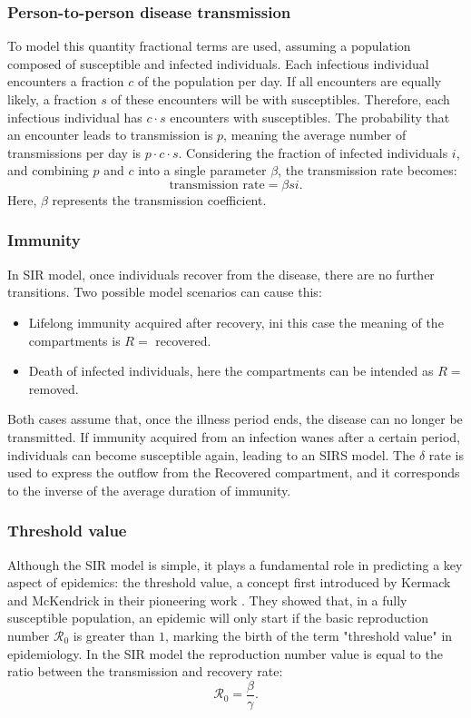 \subsubsection{Person-to-person disease transmission}
\label{subsubsec:p2p_transmission}
To model this quantity fractional terms are used, assuming a population composed of susceptible and infected individuals. Each infectious individual encounters a fraction $c$ of the population per day. If all encounters are equally likely, a fraction $s$ of these encounters will be with susceptibles. Therefore, each infectious individual has $c\cdot s$ encounters with susceptibles. The probability that an encounter leads to transmission is $p$, meaning the average number of transmissions per day is $p \cdot c \cdot s$. Considering the fraction of infected individuals $i$, and combining $p$ and $c$ into a single parameter $\beta$, the transmission rate becomes:
\[\text{transmission rate} = \beta s i.\]
Here, $\beta$ represents the transmission coefficient.


\subsubsection{Immunity}
In SIR model, once individuals recover from the disease, there are no further transitions. Two possible model scenarios can cause this:
\begin{itemize}
	\item Lifelong immunity acquired after recovery, ini this case the meaning of the compartments is $R =$ recovered.
	\item Death of infected individuals, here the compartments can be intended as $R =$ removed.
\end{itemize}
Both cases assume that, once the illness period ends, the disease can no longer be transmitted.
If immunity acquired from an infection wanes after a certain period, individuals can become susceptible again, leading to an SIRS model. The $\delta$ rate is used to express the outflow from the Recovered compartment, and it corresponds to the inverse of the average duration of immunity.

\subsubsection{Threshold value}
\label{subsub:threshold}
Although the SIR model is simple, it plays a fundamental role in predicting a key aspect of epidemics: the threshold value, a concept first introduced by Kermack and McKendrick in their pioneering work \cite{kermack1927}. They showed that, in a fully susceptible population, an epidemic will only start if the basic reproduction number $\mathcal{R}_0$ is greater than $1$, marking the birth of the term "threshold value" in epidemiology.
In the SIR model the reproduction number value is equal to the ratio between the transmission and recovery rate:
\begin{equation}
	\mathcal{R}_0 = \frac{\beta}{\gamma}. 
	\label{eq_basic_reproduction_number}
\end{equation}

